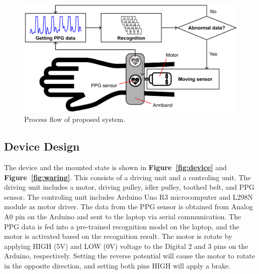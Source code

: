\documentclass[sigconf]{acmart}
\newcommand\figref[1]{\textbf{Figure~\ref{fig:#1}}}
\begin{document}
\begin{figure}[!t]
  \centering
  \includegraphics[width=1\linewidth]{figures/system.eps}
  \caption{Process flow of proposed system.}
  \label{fig:system}
\end{figure}


\subsection{Device Design}
The device and the mounted state is shown in \figref{device} and \figref{waring}. This consists of a driving unit and a controling unit. The driving unit includes a motor, driving pulley, idler pulley, toothed belt, and PPG sensor. The controling unit includes Arduino Uno R3 microcomputer and L298N module as motor driver. The data from the PPG sensor is obtained from Analog A0 pin on the Arduino and sent to the laptop via serial communication. The PPG data is fed into a pre-trained recognition model on the laptop, and the motor is activated based on the recognition result. The motor is rotate by applying HIGH (5V) and LOW (0V) voltage to the Digital 2 and 3 pins on the Arduino, respectively. Setting the reverse potential will cause the motor to rotate in the opposite direction, and setting both pins HIGH will apply a brake.
\end{document}
